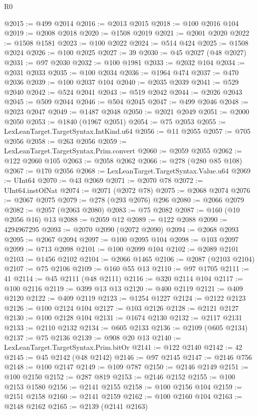 \begin{lexlean}{R0}
\begin{coremodule}
@2015 := @499 @2014
@2016 := @2013 @2015
@2018 := @100 @2016 @104
@2019 := @2008 @2018
@2020 := @1508 @2019
@2021 := @2001 @2020
@2022 := @1508 @1581
@2023 := @100 @2022
@2024 := @514 @424
@2025 := @1508 @2024
@2026 := @100 @2025
@2027 := 39
@2030 := @45 @2027 (@48 @2027)
@2031 := @97 @2030
@2032 := @100 @1981
@2033 := @2032 @104
@2034 := @2031 @2033
@2035 := @100 @2034
@2036 := @1964 @474
@2037 := @470 @2036
@2039 := @100 @2037 @104
@2040 := @2035 @2039
@2041 := @529 @2040
@2042 := @524 @2041
@2043 := @519 @2042
@2044 := @2026 @2043
@2045 := @509 @2044
@2046 := @504 @2045
@2047 := @499 @2046
@2048 := @2023 @2047
@2049 := @1487 @2048
@2050 := @2021 @2049
@2051 := @2000 @2050
@2053 := @1840 (@1967 @2051)
@2054 := @75 @2053
@2055 := LexLeanTarget.TargetSyntax.IntKind.u64
@2056 := @11 @2055
@2057 := @705 @2056
@2058 := @263 @2056
@2059 := LexLeanTarget.TargetSyntax.Prim.convert
@2060 := @2059 @2055
@2062 := @122 @2060 @105
@2063 := @2058 @2062
@2066 := @278 (@280 @85 @108)
@2067 := @170 @2056
@2068 := LexLeanTarget.TargetSyntax.Value.u64
@2069 := UInt64
@2070 := @43 @2069
@2071 := @2070 @78
@2072 := UInt64.instOfNat
@2074 := @2071 (@2072 @78)
@2075 := @2068 @2074
@2076 := @2067 @2075
@2079 := @278 (@293 @2076) @296
@2080 := @2066 @2079
@2082 := @2057 (@2063 @2080)
@2083 := @75 @2082
@2087 := @160 (@10 @2056 @16) @13
@2088 := @2059 @12
@2089 := @122 @2088
@2090 := 4294967295
@2093 := @2070 @2090 (@2072 @2090)
@2094 := @2068 @2093
@2095 := @2067 @2094
@2097 := @100 @2095 @104
@2098 := @103 @2097
@2099 := @713 @2098
@2101 := @100 @2099 @104
@2102 := @2089 @2101
@2103 := @1456 @2102
@2104 := @2066 @1465
@2106 := @2087 (@2103 @2104)
@2107 := @75 @2106
@2109 := @160 @55 @13
@2110 := @97 @1705
@2111 := 41
@2114 := @45 @2111 (@48 @2111)
@2116 := @320 @2114 @104
@2117 := @100 @2116
@2119 := @399 @13 @13
@2120 := @400 @2119
@2121 := @409 @2120
@2122 := @409 @2119
@2123 := @1254 @1227
@2124 := @2122 @2123
@2126 := @100 @2124 @104
@2127 := @103 @2126
@2128 := @2121 @2127
@2130 := @100 @2128 @104
@2131 := @1674 @2130
@2132 := @2117 @2131
@2133 := @2110 @2132
@2134 := @605 @2133
@2136 := @2109 (@605 @2134)
@2137 := @75 @2136
@2139 := @908 @20 @13
@2140 := LexLeanTarget.TargetSyntax.Prim.bitOr
@2141 := @122 @2140
@2142 := 42
@2145 := @45 @2142 (@48 @2142)
@2146 := @97 @2145
@2147 := @2146 @756
@2148 := @100 @2147
@2149 := @109 @787
@2150 := @2146 @2149
@2151 := @100 @2150
@2152 := @287 @819
@2153 := @2146 @2152
@2155 := @100 @2153 @1580
@2156 := @2141 @2155
@2158 := @100 @2156 @104
@2159 := @2151 @2158
@2160 := @2141 @2159
@2162 := @100 @2160 @104
@2163 := @2148 @2162
@2165 := @2139 (@2141 @2163)

\end{coremodule}
\end{lexlean}
